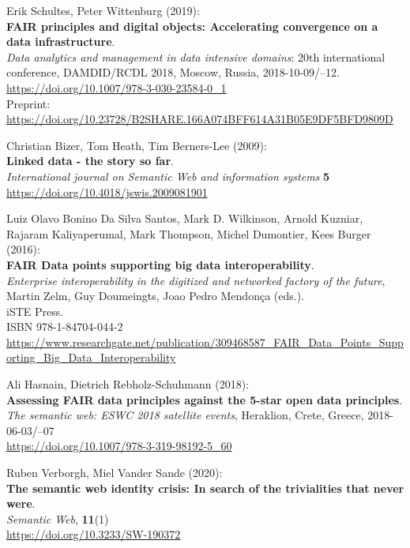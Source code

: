 \begin{thebibliography}{9}
Erik Schultes, Peter Wittenburg (2019): \\
\textbf{FAIR principles and digital objects: Accelerating convergence on a data infrastructure}.\\
\emph{Data analytics and management in data intensive domains}: 20th international conference,
{DAMDID}/{RCDL} 2018, Moscow, Russia, 2018-10-09/--12. \\
\url{https://doi.org/10.1007/978-3-030-23584-0_1}\\
Preprint: \url{https://doi.org/10.23728/B2SHARE.166A074BFF614A31B05E9DF5BFD9809D}

Christian Bizer, Tom Heath, Tim Berners-Lee (2009): \\
\textbf{Linked data - the story so far}. \\
\emph{International journal on Semantic Web and information systems} \textbf{5} \\
\url{https://doi.org/10.4018/jswis.2009081901}

Luiz Olavo Bonino Da Silva Santos, Mark D. Wilkinson, Arnold Kuzniar,
Rajaram Kaliyaperumal, Mark Thompson, Michel Dumontier, Kees Burger
(2016):\\
\textbf{FAIR Data points supporting big data interoperability}. \\
\emph{Enterprise interoperability in the digitized and networked factory of the future}, Martin Zelm, Guy Doumeingts, Joao Pedro Mendonça (eds.).\\
iSTE Press. \\
ISBN 978-1-84704-044-2 \\
\url{https://www.researchgate.net/publication/309468587_FAIR_Data_Points_Supporting_Big_Data_Interoperability}

Ali Hasnain, Dietrich Rebholz-Schuhmann (2018): \\
\textbf{Assessing FAIR data principles against the 5-star open data principles}. \\
\emph{The semantic web: ESWC 2018 satellite events}, Heraklion, Crete, Greece, 2018-06-03/--07 \\
\url{https://doi.org/10.1007/978-3-319-98192-5_60}

Ruben Verborgh, Miel Vander Sande (2020): \\
\textbf{The semantic web identity crisis: In search of the trivialities that never were}.\\
\emph{Semantic Web}, \textbf{11}(1)\\
\url{https://doi.org/10.3233/SW-190372}


\end{thebibliography}
